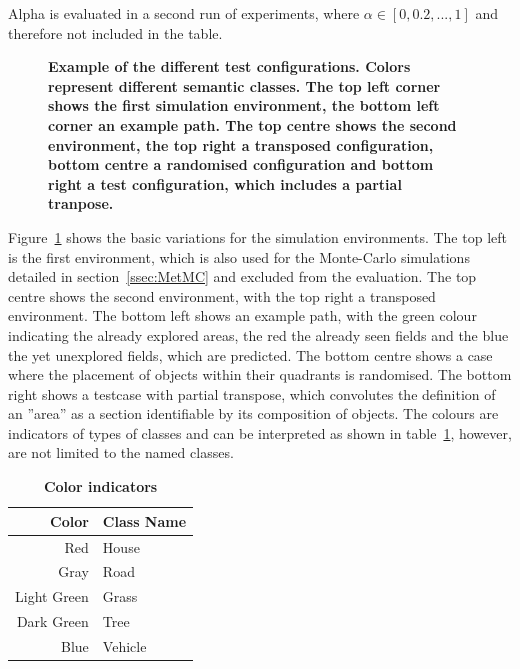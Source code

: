 \documentclass[twocolumn,letterpaper]{IEEEAerospaceCLS}  %
\begin{document}
Alpha is evaluated in a second run of experiments, where $\alpha \in [0, 0.2, ..., 1]$ and therefore not included in the table. 
\begin{figure}
    \centering
    \caption{\bf{
        Example of the different test configurations. Colors represent different semantic classes. The top left corner shows the first simulation environment, the bottom left corner an example path. The top centre shows the second environment, the top right a transposed configuration, bottom centre a randomised configuration and bottom right a test configuration, which includes a partial tranpose.
    }}
    \label{fig:SimCase}
\end{figure}
Figure~\ref{fig:SimCase} shows the basic variations for the simulation environments. The top left is the first environment, which is also used for the Monte-Carlo simulations detailed in section~\ref{ssec:MetMC} and excluded from the evaluation. The top centre shows the second environment, with the top right a transposed environment. The bottom left shows an example path, with the green colour indicating the already explored areas, the red the already seen fields and the blue the yet unexplored fields, which are predicted. The bottom centre shows a case where the placement of objects within their quadrants is randomised. The bottom right shows a testcase with partial transpose, which convolutes the definition of an ''area'' as a section identifiable by its composition of objects. The colours are indicators of types of classes and can be interpreted as shown in table~\ref{tab:colors}, however, are not limited to the named classes.
\begin{table}[]
    \renewcommand{\arraystretch}{1.3}
    \caption{\bf Color indicators}
    \label{tab:colors}
    \centering
    \begin{tabular}{|r||l|}
        \hline
        \bfseries Color      & \bfseries Class Name    \\
        \hline \hline
        Red &  House\\
        \hline
        Gray  & Road         \\
        \hline
        Light Green     & Grass              \\
        \hline
        Dark Green & Tree           \\
        \hline
        Blue & Vehicle \\
        \hline
    \end{tabular}
\end{table}
\end{document}
